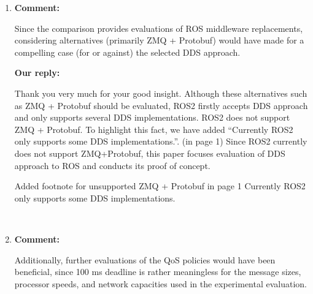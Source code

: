 \documentclass{article}
\begin{document}
\begin{enumerate}
\item \begin{flushleft}
  \textbf{Comment:}
\end{flushleft}
  Since the comparison provides evaluations of ROS middleware replacements, considering alternatives (primarily ZMQ + Protobuf) would have made for a compelling case (for or against) the selected DDS approach.

  \begin{flushleft}
    \textbf{Our reply:}
  \end{flushleft}
  Thank you very much for your good insight. 
  Although these alternatives such as ZMQ + Protobuf should be evaluated, ROS2 firstly accepts DDS approach and only supports several DDS implementations.
  ROS2 does not support ZMQ + Protobuf.
  To highlight this fact, we have added ``Currently ROS2 only supports some DDS implementations.''. (in page 1)
  Since ROS2 currently does not support ZMQ+Protobuf, this paper focuses evaluation of DDS approach to ROS and conducts its proof of concept.
  \begin{itembox}[|]{Added footnote for unsupported ZMQ + Protobuf in page 1}
    Currently ROS2 only supports some DDS implementations.
  \end{itembox}\\
  
\item \begin{flushleft}
  \textbf{Comment:}
\end{flushleft}
  Additionally, further evaluations of the QoS policies would have been beneficial, since 100 ms deadline is rather meaningless for the message sizes, processor speeds, and network capacities used in the experimental evaluation.


\end{enumerate}
\end{document}
